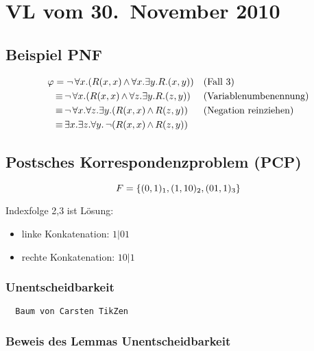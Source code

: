 \section{VL vom 30.~November 2010}

\subsection{Beispiel PNF}

\begin{align}
  \varphi &= \operatorname{\neg}\forall x.(R(x,x) \operatorname{\wedge} \forall x.\exists y.R.(x,y)) && \text{(Fall 3)} \\
    &\operatorname{\equiv} \operatorname{\neg}\forall x.(R(x,x) \operatorname{\wedge} \forall z.\exists y.R.(z,y)) && \text{(Variablenumbenennung)} \\
    &\operatorname{\equiv} \operatorname{\neg}\forall x.\forall z.\exists y.(R(x,x) \operatorname{\wedge} R(z,y)) && \text{(Negation reinziehen)} \\
    &\operatorname{\equiv} \exists x.\exists z.\forall y. \operatorname{\neg}(R(x,x) \operatorname{\wedge} R(z,y))
\end{align}

\subsection{Postsches Korrespondenzproblem (PCP)}

\[
  F = \left\{(0,1)_1, (1,10)_2, (01,1)_3\right\}
\]

Indexfolge 2,3 ist Lösung:

\begin{itemize}
  \item linke Konkatenation:  $1|0 1$
  \item rechte Konkatenation: $1 0|1$
\end{itemize}

\subsubsection{Unentscheidbarkeit}

\begin{verbatim}
  Baum von Carsten TikZen
\end{verbatim}

\subsubsection{Beweis des Lemmas Unentscheidbarkeit}

